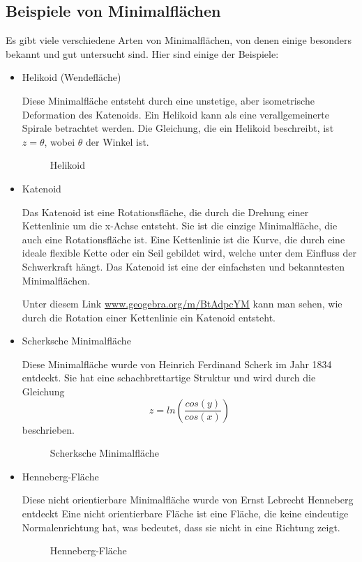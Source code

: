 \subsection{Beispiele von Minimalflächen
	\label{minimalflaechen:subsection:Beispiele von Minimalflächen}}
Es gibt viele verschiedene Arten von Minimalflächen, von denen einige besonders bekannt und gut untersucht sind.
Hier sind einige der Beispiele:
\begin{itemize}
	\item
	Helikoid (Wendefläche)
	
	Diese Minimalfläche entsteht durch eine unstetige, aber isometrische Deformation des Katenoids.
	Ein Helikoid kann als eine verallgemeinerte Spirale betrachtet werden.
	Die Gleichung, die ein Helikoid beschreibt, ist $z=\theta$, wobei $\theta$ der Winkel ist.
	\begin{figure}
		\centering
		\caption{Helikoid}
		\label{fig:helikoid}
	\end{figure}
	\item
	Katenoid
	
	Das Katenoid ist eine Rotationsfläche, die durch die Drehung einer Kettenlinie um die x-Achse entsteht.
	Sie ist die einzige Minimalfläche, die auch eine Rotationsfläche ist.
	Eine Kettenlinie ist die Kurve, die durch eine ideale flexible Kette oder ein Seil gebildet wird, welche unter dem Einfluss der Schwerkraft hängt.
	Das Katenoid ist eine der einfachsten und bekanntesten Minimalflächen.
	
	Unter diesem Link \href{https://www.geogebra.org/m/BtAdpcYM}{www.geogebra.org/m/BtAdpcYM} kann man sehen, wie durch die Rotation einer Kettenlinie ein Katenoid entsteht.
	\item
	Scherksche Minimalfläche
	
	Diese Minimalfläche wurde von Heinrich Ferdinand Scherk im Jahr 1834 entdeckt.
	Sie hat eine schachbrettartige Struktur und wird durch die Gleichung 
	\begin{equation}
		z=ln(\frac{cos(y)}{cos(x)}) 
	\end{equation}
	beschrieben.
	
	\begin{figure}
		\centering
		\caption{Scherksche Minimalfläche}
		\label{fig:schreksche-minimalflache}
	\end{figure}
	\item
	Henneberg-Fläche
	
	Diese nicht orientierbare Minimalfläche wurde von Ernst Lebrecht Henneberg entdeckt
	Eine nicht orientierbare Fläche ist eine Fläche, die keine eindeutige Normalenrichtung hat, was bedeutet, dass sie nicht in eine Richtung zeigt.
	
	\begin{figure}
		\centering
		\caption{Henneberg-Fläche}
		\label{fig:henneberg-flache}
	\end{figure}
\end{itemize}

